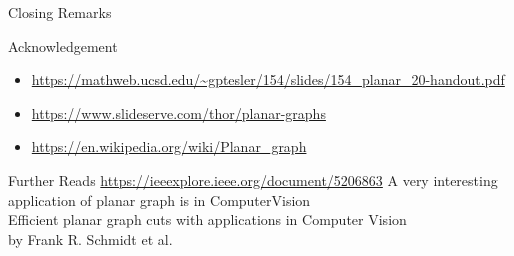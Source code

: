 \begin{section}{Closing Remarks}

    


\begin{frame}{Acknowledgement}
\small{
\begin{itemize}
    \item \url{https://mathweb.ucsd.edu/~gptesler/154/slides/154_planar_20-handout.pdf}
    \item \url{https://www.slideserve.com/thor/planar-graphs}
    \item \url{https://en.wikipedia.org/wiki/Planar_graph}
    \end{itemize}
}
\end{frame}



\begin{frame}{Further Reads}
\url{https://ieeexplore.ieee.org/document/5206863} \newline \newline
A very interesting application of planar graph is in ComputerVision \\
Efficient planar graph cuts with applications in Computer Vision\\
by Frank R. Schmidt et al.
    
\end{frame}

\end{section}
